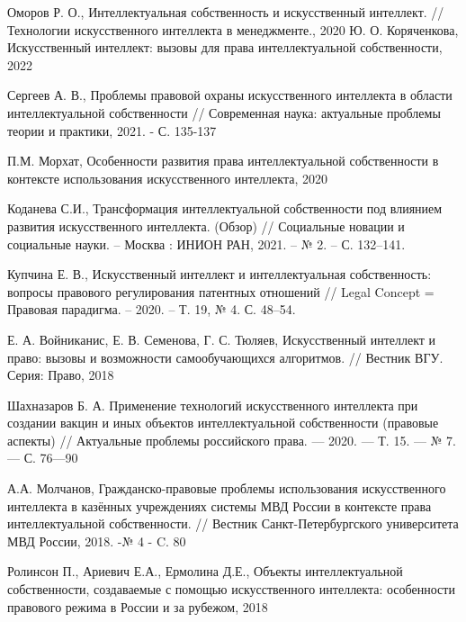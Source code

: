 \begin{thebibliography}{}
Оморов Р. О., Интеллектуальная собственность и искусственный интеллект. // Технологии искусственного
интеллекта в менеджменте., 2020
Ю. О. Коряченкова, Искусственный интеллект: вызовы для права интеллектуальной
собственности, 2022

Сергеев А. В., Проблемы правовой охраны искусственного интеллекта в области
интеллектуальной собственности // Современная наука: актуальные проблемы
теории и практики, 2021. - С. 135-137

П.М. Морхат, Особенности развития права интеллектуальной собственности в
контексте использования искусственного интеллекта, 2020

Коданева С.И., Трансформация интеллектуальной собственности под влиянием развития искусственного интеллекта.
(Обзор) // Социальные новации и социальные науки. – Москва : ИНИОН РАН, 2021. – № 2. – С. 132–141.

Купчина Е. В., Искусственный интеллект и интеллектуальная собственность: вопросы правового регулирования патентных отношений
// Legal Concept = Правовая парадигма. – 2020. – Т. 19, № 4. С. 48–54.

Е. А. Войниканис, Е. В. Семенова, Г. С. Тюляев, Искусственный интеллект и право: вызовы и возможности
самообучающихся алгоритмов. // Вестник ВГУ. Серия: Право, 2018

Шахназаров Б. А. Применение технологий искусственного интеллекта при создании вакцин и иных объектов интеллектуальной
собственности (правовые аспекты) // Актуальные проблемы российского права. — 2020. — Т. 15. — № 7. — С. 76—90

А.А. Молчанов, Гражданско-правовые проблемы использования искусственного интеллекта в казённых учреждениях
системы МВД России в контексте права интеллектуальной собственности. // Вестник Санкт-Петербургского университета
МВД России, 2018. -№ 4 - C. 80

Ролинсон П., Ариевич Е.А., Ермолина Д.Е., Объекты интеллектуальной собственности, создаваемые с помощью
искусственного интеллекта: особенности правового режима в России и за рубежом, 2018

\end{thebibliography}




